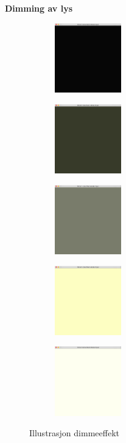 \textbf{Dimming av lys}\newline
\begin{figure}[h]
\centering
\begin{subfigure}{0.19\textwidth}
\includegraphics[width=3cm, height=3cm]{fig/light-1}
\caption{}
\label{fig:light-1}
\end{subfigure}
\begin{subfigure}{0.19\textwidth}
\includegraphics[width=3cm, height=3cm]{fig/light-2}
\caption{}
\label{fig:light-2}
\end{subfigure}
\begin{subfigure}{0.19\textwidth}
\includegraphics[width=3cm, height=3cm]{fig/light-3}
\caption{}
\label{fig:light-3}
\end{subfigure}
\begin{subfigure}{0.19\textwidth}
\includegraphics[width=3cm, height=3cm]{fig/light-4}
\caption{}
\label{fig:light-4}
\end{subfigure}
\begin{subfigure}{0.19\textwidth}
\includegraphics[width=3cm, height=3cm]{fig/light-5}
\caption{}
\label{fig:light-5}
\end{subfigure}
\caption{Illustrasjon dimmeeffekt}
\label{fig:light}
\end{figure}

